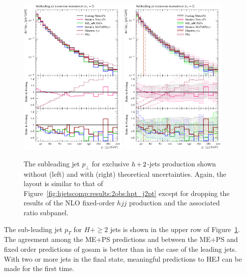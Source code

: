 \begin{figure}[t!]
  \centering
  \includegraphics[width=0.47\textwidth]{figures/hjetscomp_u_jet2_pT_excl.pdf}
  \hfill
  \includegraphics[width=0.47\textwidth]{figures/hjetscomp_jet2_pT_excl.pdf}
  \caption{\label{fig:hjetscomp:results:2obs:jet2_pt}%
    The subleading jet $p_\perp$ for exclusive $h\!\text{~+~}\!2$-jets production
    shown without (left) and with (right) theoretical uncertainties.
    Again, the layout is similar to that of
    Figure~\ref{fig:hjetscomp:results:2obs:hpt_j2pt} except for
    dropping the results of the NLO fixed-order $hjj$ production and
    the associated ratio subpanel.}
\end{figure}

The sub-leading jet $p_T$ for $H+\ge2$ jets is shown in the upper row
of Figure~\ref{fig:hjetscomp:results:2obs:jet2_pt}.  The agreement
among the ME+PS predictions and between the ME+PS and fixed order
predictions of gosam is better than in the case of the leading
jets. With two or more jets in the final state, meaningful predictions
to HEJ can be made for the first time.

